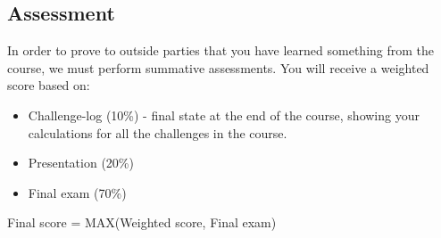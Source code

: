 \subsection{Assessment}
In order to prove to outside parties that you have learned something from the course, we must perform summative assessments. You will receive a weighted score based on:

\begin{itemize}
    \item Challenge-log (10\%) - final state at the end of the course, showing your calculations for all the challenges in the course.
    \item Presentation (20\%)
    \item Final exam (70\%)
\end{itemize}

Final score = MAX(Weighted score, Final exam)
